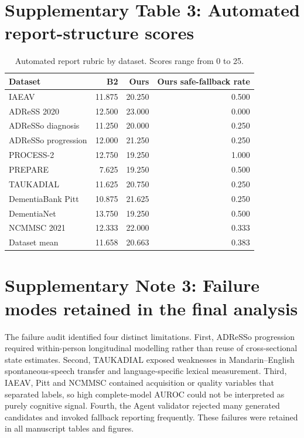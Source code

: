 \documentclass[pdflatex,sn-nature]{sn-jnl}
\begin{document}
\section*{Supplementary Table 3: Automated report-structure scores}

\begin{table}[t]
\caption{Automated report rubric by dataset. Scores range from 0 to 25.}
\centering
\begin{tabular}{lrrr}
\toprule
Dataset & B2 & Ours & Ours safe-fallback rate \\
\midrule
IAEAV & 11.875 & 20.250 & 0.500 \\
ADReSS 2020 & 12.500 & 23.000 & 0.000 \\
ADReSSo diagnosis & 11.250 & 20.000 & 0.250 \\
ADReSSo progression & 12.000 & 21.250 & 0.250 \\
PROCESS-2 & 12.750 & 19.250 & 1.000 \\
PREPARE & 7.625 & 19.250 & 0.500 \\
TAUKADIAL & 11.625 & 20.750 & 0.250 \\
DementiaBank Pitt & 10.875 & 21.625 & 0.250 \\
DementiaNet & 13.750 & 19.250 & 0.500 \\
NCMMSC 2021 & 12.333 & 22.000 & 0.333 \\
\midrule
Dataset mean & 11.658 & 20.663 & 0.383 \\
\bottomrule
\end{tabular}
\end{table}
\clearpage

\section*{Supplementary Note 3: Failure modes retained in the final analysis}

The failure audit identified four distinct limitations. First, ADReSSo progression required within-person longitudinal modelling rather than reuse of cross-sectional state estimates. Second, TAUKADIAL exposed weaknesses in Mandarin--English spontaneous-speech transfer and language-specific lexical measurement. Third, IAEAV, Pitt and NCMMSC contained acquisition or quality variables that separated labels, so high complete-model AUROC could not be interpreted as purely cognitive signal. Fourth, the Agent validator rejected many generated candidates and invoked fallback reporting frequently. These failures were retained in all manuscript tables and figures.
\end{document}
